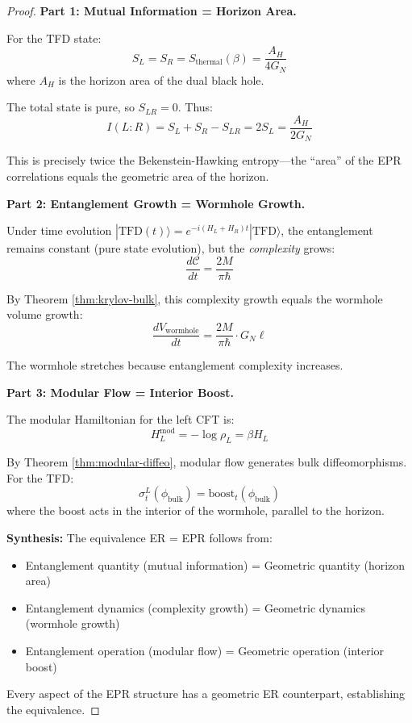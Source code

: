 \documentclass[12pt,a4paper]{article}
\begin{document}
\begin{proof}
\textbf{Part 1: Mutual Information = Horizon Area.}

For the TFD state:
\begin{equation}
S_L = S_R = S_{\text{thermal}}(\beta) = \frac{A_H}{4G_N}
\end{equation}
where $A_H$ is the horizon area of the dual black hole.

The total state is pure, so $S_{LR} = 0$. Thus:
\begin{equation}
I(L:R) = S_L + S_R - S_{LR} = 2S_L = \frac{A_H}{2G_N}
\end{equation}

This is precisely twice the Bekenstein-Hawking entropy---the ``area'' of the EPR correlations equals the geometric area of the horizon.

\textbf{Part 2: Entanglement Growth = Wormhole Growth.}

Under time evolution $|\text{TFD}(t)\rangle = e^{-i(H_L + H_R)t}|\text{TFD}\rangle$, the entanglement remains constant (pure state evolution), but the \emph{complexity} grows:
\begin{equation}
\frac{d\mathcal{C}}{dt} = \frac{2M}{\pi\hbar}
\end{equation}

By Theorem \ref{thm:krylov-bulk}, this complexity growth equals the wormhole volume growth:
\begin{equation}
\frac{dV_{\text{wormhole}}}{dt} = \frac{2M}{\pi\hbar} \cdot G_N \ell
\end{equation}

The wormhole stretches because entanglement complexity increases.

\textbf{Part 3: Modular Flow = Interior Boost.}

The modular Hamiltonian for the left CFT is:
\begin{equation}
H_L^{\text{mod}} = -\log\rho_L = \beta H_L
\end{equation}

By Theorem \ref{thm:modular-diffeo}, modular flow generates bulk diffeomorphisms. For the TFD:
\begin{equation}
\sigma_t^L(\phi_{\text{bulk}}) = \text{boost}_t(\phi_{\text{bulk}})
\end{equation}
where the boost acts in the interior of the wormhole, parallel to the horizon.

\textbf{Synthesis:}
The equivalence ER = EPR follows from:
\begin{itemize}
    \item Entanglement quantity (mutual information) = Geometric quantity (horizon area)
    \item Entanglement dynamics (complexity growth) = Geometric dynamics (wormhole growth)
    \item Entanglement operation (modular flow) = Geometric operation (interior boost)
\end{itemize}

Every aspect of the EPR structure has a geometric ER counterpart, establishing the equivalence.
\end{proof}
\end{document}
